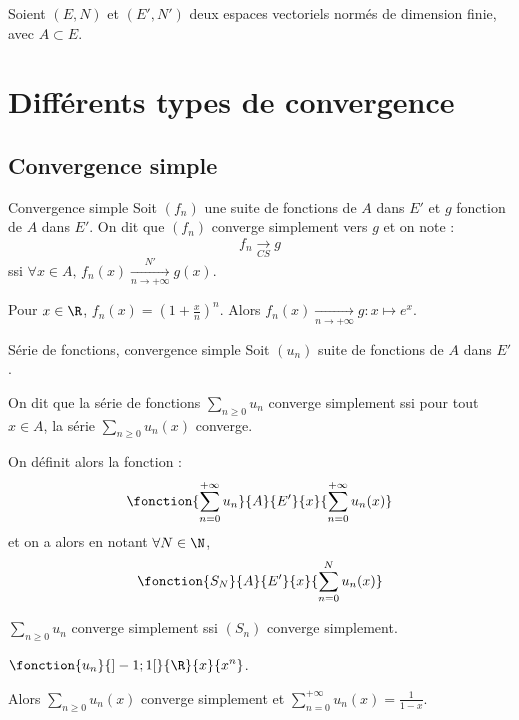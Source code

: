 Soient $(E, N)$ et $(E', N')$ deux espaces vectoriels normés de dimension finie, avec 
$A \subset E$.

\section{Différents types de convergence}
\subsection{Convergence simple }

\begin{definition}{Convergence simple}{}
    Soit $(f_n)$ une suite de fonctions de $A$ dans $E'$ et $g$ fonction de $A$ dans $E'$. 
    On dit que $(f_n)$ converge simplement vers $g$ et on note :
    \[f_n \xrightarrow[CS]{} g\]
    ssi $\forall x \in A, \, f_n(x) \xrightarrow[n\to +\infty]{N'} g(x)$.
\end{definition}

\begin{exemple}
    Pour $x \in \R$, $f_n(x) = \left( 1 + \frac x n \right)^n$.
    Alors $f_n(x) \xrightarrow[n\to +\infty]{} g : x \mapsto e^x$.
\end{exemple}

\begin{definition}{Série de fonctions, convergence simple}{}
    Soit $(u_n)$ suite de fonctions de $A$ dans $E'$.

    On dit que la série de fonctions $\displaystyle \sum_{n \geqslant 0} u_n$ converge simplement 
    ssi pour tout $x \in A$, la série $\displaystyle \sum_{n \geqslant 0} u_n(x)$ converge.

    On définit alors la fonction :
    \[
        \fonction{\sum_{n = 0 }^{ + \infty } u_n }{A}{E'}{x}{\sum_{n = 0}^{ + \infty } u_n(x)}
    \]
    et on a alors en notant $\forall N \in \N$, \[\fonction{S_N}{A}{E'}{x}{\sum_{n = 0}^N u_n(x)}\]

    $\displaystyle \sum_{n \geqslant 0} u_n$ converge simplement ssi $(S_n)$ converge simplement.

\end{definition}

\begin{exemple}
    $\displaystyle \fonction{u_n}{]-1; 1[}{\R}{x}{x^n}$.

    Alors $\displaystyle \sum_{n \geqslant 0} u_n(x)$ converge simplement et $\displaystyle \sum_{n = 0}^{ + \infty } u_n(x) = \frac{1}{1-x}$.
\end{exemple}


